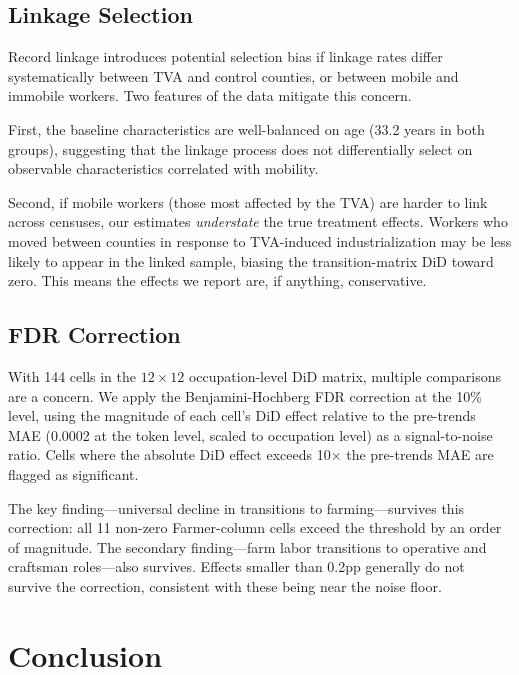 \documentclass[12pt]{article}
\begin{document}
\subsection{Linkage Selection}

Record linkage introduces potential selection bias if linkage rates differ systematically between TVA and control counties, or between mobile and immobile workers. Two features of the data mitigate this concern.

First, the baseline characteristics are well-balanced on age (33.2 years in both groups), suggesting that the linkage process does not differentially select on observable characteristics correlated with mobility.

Second, if mobile workers (those most affected by the TVA) are harder to link across censuses, our estimates \textit{understate} the true treatment effects. Workers who moved between counties in response to TVA-induced industrialization may be less likely to appear in the linked sample, biasing the transition-matrix DiD toward zero. This means the effects we report are, if anything, conservative.

\subsection{FDR Correction}

With 144 cells in the $12 \times 12$ occupation-level DiD matrix, multiple comparisons are a concern. We apply the Benjamini-Hochberg FDR correction at the 10\% level, using the magnitude of each cell's DiD effect relative to the pre-trends MAE (0.0002 at the token level, scaled to occupation level) as a signal-to-noise ratio. Cells where the absolute DiD effect exceeds 10$\times$ the pre-trends MAE are flagged as significant.

The key finding---universal decline in transitions to farming---survives this correction: all 11 non-zero Farmer-column cells exceed the threshold by an order of magnitude. The secondary finding---farm labor transitions to operative and craftsman roles---also survives. Effects smaller than 0.2pp generally do not survive the correction, consistent with these being near the noise floor.


\section{Conclusion}
\label{sec:conclusion}
\end{document}
